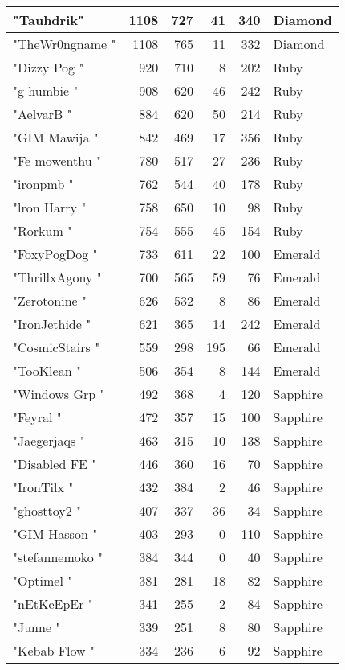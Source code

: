 \documentclass{article}
\begin{document}
\begin{table}[htbp]
\begin{tabular}{|l|r|r|r|r|l|}
"Tauhdrik" & 1108 & 727 & 41 & 340 & Diamond \\ \hline
"TheWr0ngname " & 1108 & 765 & 11 & 332 & Diamond \\ \hline
"Dizzy Pog " & 920 & 710 & 8 & 202 & Ruby \\ \hline
"g humbie " & 908 & 620 & 46 & 242 & Ruby \\ \hline
"AelvarB " & 884 & 620 & 50 & 214 & Ruby \\ \hline
"GIM Mawija " & 842 & 469 & 17 & 356 & Ruby \\ \hline
"Fe mowenthu " & 780 & 517 & 27 & 236 & Ruby \\ \hline
"ironpmb " & 762 & 544 & 40 & 178 & Ruby \\ \hline
"lron Harry " & 758 & 650 & 10 & 98 & Ruby \\ \hline
"Rorkum " & 754 & 555 & 45 & 154 & Ruby \\ \hline
"FoxyPogDog " & 733 & 611 & 22 & 100 & Emerald \\ \hline
"ThrillxAgony " & 700 & 565 & 59 & 76 & Emerald \\ \hline
"Zerotonine " & 626 & 532 & 8 & 86 & Emerald \\ \hline
"IronJethide " & 621 & 365 & 14 & 242 & Emerald \\ \hline
"CosmicStairs " & 559 & 298 & 195 & 66 & Emerald \\ \hline
"TooKlean " & 506 & 354 & 8 & 144 & Emerald \\ \hline
"Windows Grp " & 492 & 368 & 4 & 120 & Sapphire \\ \hline
"Feyral " & 472 & 357 & 15 & 100 & Sapphire \\ \hline
"Jaegerjaqs " & 463 & 315 & 10 & 138 & Sapphire \\ \hline
"Disabled FE " & 446 & 360 & 16 & 70 & Sapphire \\ \hline
"IronTilx " & 432 & 384 & 2 & 46 & Sapphire \\ \hline
"ghosttoy2 " & 407 & 337 & 36 & 34 & Sapphire \\ \hline
"GIM Hasson " & 403 & 293 & 0 & 110 & Sapphire \\ \hline
"stefannemoko " & 384 & 344 & 0 & 40 & Sapphire \\ \hline
"Optimel " & 381 & 281 & 18 & 82 & Sapphire \\ \hline
"nEtKeEpEr " & 341 & 255 & 2 & 84 & Sapphire \\ \hline
"Junne " & 339 & 251 & 8 & 80 & Sapphire \\ \hline
"Kebab Flow " & 334 & 236 & 6 & 92 & Sapphire \\ \hline

\end{tabular}
\end{table}
\end{document}
